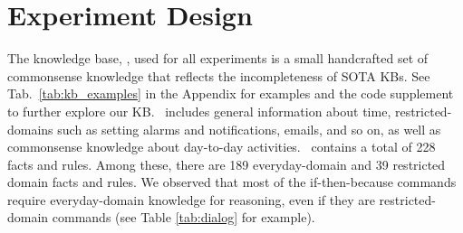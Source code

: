\section{Experiment Design}
The knowledge base, \KB, used for all experiments is a small handcrafted set of commonsense knowledge that reflects the incompleteness of SOTA KBs. See Tab.~\ref{tab:kb_examples} in the Appendix for examples and the code supplement to further explore our KB.
\KB~includes general information about time, restricted-domains such as setting alarms and notifications, emails, and so on, as well as commonsense knowledge about day-to-day activities. \KB~contains a total of 228 facts and rules. Among these, there are 189 everyday-domain and 39 restricted domain facts and rules. We observed that most of the if-then-because commands require everyday-domain knowledge for reasoning, even if they are restricted-domain commands (see Table \ref{tab:dialog} for example). 

